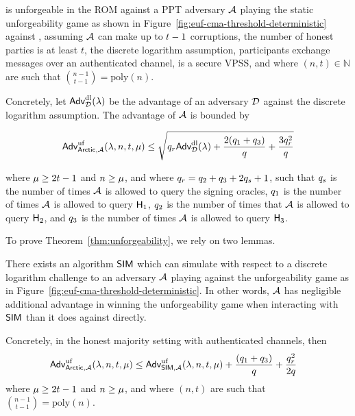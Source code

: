 \begin{theorem}\label{thm:unforgeability}
	\glitter is unforgeable in the ROM against a PPT adversary $\mathcal{A}$ playing the static unforgeability game as shown in
  Figure~\ref{fig:euf-cma-threshold-deterministic} against \glitter,
  assuming $\mathcal{A}$ can make up to $t-1$ corruptions,
  the number of honest parties is at least $t$,
  the discrete logarithm assumption,
  participants exchange messages over an authenticated channel,
  \DVRFOne is a secure VPSS,
  and where $(n, t) \in \mathbb{N}$  are such that ${n-1\choose t-1} = \text{poly}(n)$.

  Concretely, let $\textsf{\upshape Adv}^{\textrm{\upshape dl}}_{\mathcal{D}}(\lambda) $ be the advantage of an adversary $\mathcal{D}$ against the discrete logarithm assumption.
  The advantage of $\mathcal{A}$ is bounded by


  \begin{equation*} \label{eq:glitter-adv}
    \textsf{\upshape Adv}^{\textrm{\upshape uf}}_{\mathsf{Arctic},\mathcal{A}}(\lambda, n, t, \mu) \leq
    \sqrt{ q_r \textsf{\upshape Adv}^{\textrm{\upshape dl}}_{\mathcal{D}}(\lambda)
    + \frac{2(q_1 + q_3)}{q}
    + \frac{3q_r^2}{q}
    }
  \end{equation*}

where $\mu \geq 2t-1$ and $n \geq \mu$,
and where $q_r = q_2 +q_3 + 2q_s + 1$,
such that $q_s$ is the number of times $\mathcal{A}$ is allowed to query the signing oracles,
$q_1$ is the number of times $\mathcal{A}$ is allowed to query $\mathsf{H}_1$,
$q_2$ is the number of times that $\mathcal{A}$ is allowed to query $\mathsf{H}_2$,
and $q_3$ is the number of times $\mathcal{A}$ is allowed to query $\mathsf{H}_3$.
\end{theorem}

To prove Theorem~\ref{thm:unforgeability},
we rely on two lemmas.


\begin{lemma} \label{lem:simulation}
There exists an algorithm $\mathsf{SIM}$ which can simulate \glitter with respect to a discrete logarithm challenge to an adversary $\mathcal{A}$
playing against the unforgeability game as in
Figure~\ref{fig:euf-cma-threshold-deterministic}.
In other words,
$\mathcal{A}$ has negligible additional advantage in winning the unforgeability game when
interacting with $\mathsf{SIM}$ than it does against \glitter directly.

Concretely, in the honest majority setting with authenticated channels, then
\begin{align} \label{eq:simulation}
  \begin{split}
    \textsf{\upshape Adv}^{\textrm{\upshape uf}}_{\mathsf{Arctic}, \mathcal{A}}(\lambda, n, t, \mu)  & \leq
        \textsf{\upshape Adv}^{\textrm{\upshape uf}}_{\mathsf{SIM}, \mathcal{A}}(\lambda, n, t, \mu) +
        \frac{(q_1 + q_3)}{q}
        + \frac{q_r^2}{2q}
  \end{split}
\end{align}
where $\mu \geq 2t-1$ and $n \geq \mu$,
and where $(n, t)$  are such that ${n-1\choose t-1} = \text{poly}(n)$.
\end{lemma}


